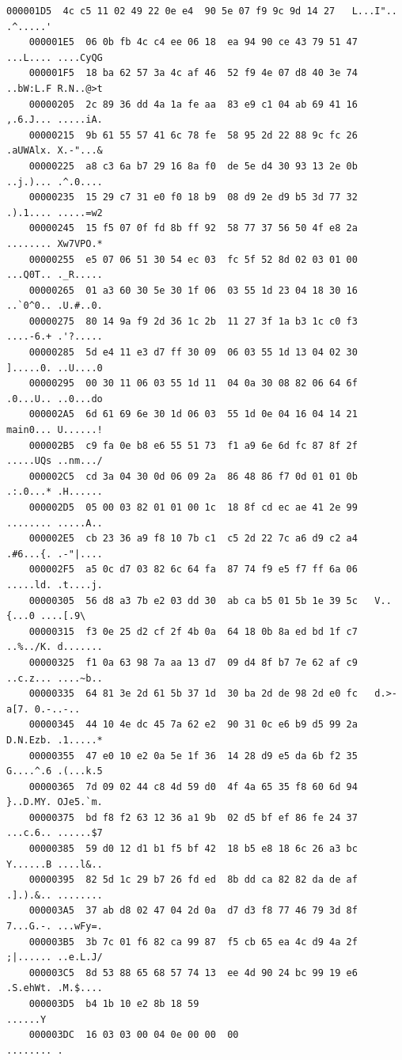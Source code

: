\documentclass[12pt,twoside,a4]{mwbk}
\theoremstyle{definition}
\begin{document}
\begin{lstlisting}[keywordstyle=\color{Black},
  commentstyle=\color{Black},
  stringstyle=\color{Black},
  identifierstyle=\color{Black}]
    000001D5  4c c5 11 02 49 22 0e e4  90 5e 07 f9 9c 9d 14 27   L...I".. .^.....'
    000001E5  06 0b fb 4c c4 ee 06 18  ea 94 90 ce 43 79 51 47   ...L.... ....CyQG
    000001F5  18 ba 62 57 3a 4c af 46  52 f9 4e 07 d8 40 3e 74   ..bW:L.F R.N..@>t
    00000205  2c 89 36 dd 4a 1a fe aa  83 e9 c1 04 ab 69 41 16   ,.6.J... .....iA.
    00000215  9b 61 55 57 41 6c 78 fe  58 95 2d 22 88 9c fc 26   .aUWAlx. X.-"...&
    00000225  a8 c3 6a b7 29 16 8a f0  de 5e d4 30 93 13 2e 0b   ..j.)... .^.0....
    00000235  15 29 c7 31 e0 f0 18 b9  08 d9 2e d9 b5 3d 77 32   .).1.... .....=w2
    00000245  15 f5 07 0f fd 8b ff 92  58 77 37 56 50 4f e8 2a   ........ Xw7VPO.*
    00000255  e5 07 06 51 30 54 ec 03  fc 5f 52 8d 02 03 01 00   ...Q0T.. ._R.....
    00000265  01 a3 60 30 5e 30 1f 06  03 55 1d 23 04 18 30 16   ..`0^0.. .U.#..0.
    00000275  80 14 9a f9 2d 36 1c 2b  11 27 3f 1a b3 1c c0 f3   ....-6.+ .'?.....
    00000285  5d e4 11 e3 d7 ff 30 09  06 03 55 1d 13 04 02 30   ].....0. ..U....0
    00000295  00 30 11 06 03 55 1d 11  04 0a 30 08 82 06 64 6f   .0...U.. ..0...do
    000002A5  6d 61 69 6e 30 1d 06 03  55 1d 0e 04 16 04 14 21   main0... U......!
    000002B5  c9 fa 0e b8 e6 55 51 73  f1 a9 6e 6d fc 87 8f 2f   .....UQs ..nm.../
    000002C5  cd 3a 04 30 0d 06 09 2a  86 48 86 f7 0d 01 01 0b   .:.0...* .H......
    000002D5  05 00 03 82 01 01 00 1c  18 8f cd ec ae 41 2e 99   ........ .....A..
    000002E5  cb 23 36 a9 f8 10 7b c1  c5 2d 22 7c a6 d9 c2 a4   .#6...{. .-"|....
    000002F5  a5 0c d7 03 82 6c 64 fa  87 74 f9 e5 f7 ff 6a 06   .....ld. .t....j.
    00000305  56 d8 a3 7b e2 03 dd 30  ab ca b5 01 5b 1e 39 5c   V..{...0 ....[.9\
    00000315  f3 0e 25 d2 cf 2f 4b 0a  64 18 0b 8a ed bd 1f c7   ..%../K. d.......
    00000325  f1 0a 63 98 7a aa 13 d7  09 d4 8f b7 7e 62 af c9   ..c.z... ....~b..
    00000335  64 81 3e 2d 61 5b 37 1d  30 ba 2d de 98 2d e0 fc   d.>-a[7. 0.-..-..
    00000345  44 10 4e dc 45 7a 62 e2  90 31 0c e6 b9 d5 99 2a   D.N.Ezb. .1.....*
    00000355  47 e0 10 e2 0a 5e 1f 36  14 28 d9 e5 da 6b f2 35   G....^.6 .(...k.5
    00000365  7d 09 02 44 c8 4d 59 d0  4f 4a 65 35 f8 60 6d 94   }..D.MY. OJe5.`m.
    00000375  bd f8 f2 63 12 36 a1 9b  02 d5 bf ef 86 fe 24 37   ...c.6.. ......$7
    00000385  59 d0 12 d1 b1 f5 bf 42  18 b5 e8 18 6c 26 a3 bc   Y......B ....l&..
    00000395  82 5d 1c 29 b7 26 fd ed  8b dd ca 82 82 da de af   .].).&.. ........
    000003A5  37 ab d8 02 47 04 2d 0a  d7 d3 f8 77 46 79 3d 8f   7...G.-. ...wFy=.
    000003B5  3b 7c 01 f6 82 ca 99 87  f5 cb 65 ea 4c d9 4a 2f   ;|...... ..e.L.J/
    000003C5  8d 53 88 65 68 57 74 13  ee 4d 90 24 bc 99 19 e6   .S.ehWt. .M.$....
    000003D5  b4 1b 10 e2 8b 18 59                               ......Y
    000003DC  16 03 03 00 04 0e 00 00  00                        ........ .
\end{lstlisting}
\end{document}
